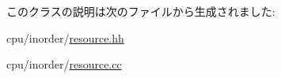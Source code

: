 このクラスの説明は次のファイルから生成されました:\begin{DoxyCompactItemize}
\item 
cpu/inorder/\hyperlink{resource_8hh}{resource.hh}\item 
cpu/inorder/\hyperlink{resource_8cc}{resource.cc}\end{DoxyCompactItemize}
